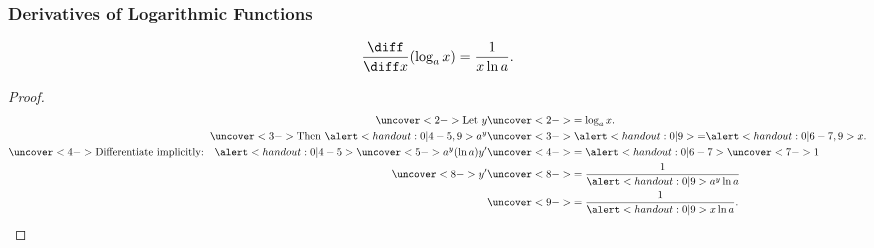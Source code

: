 \begin{frame}
\frametitle{Derivatives of Logarithmic Functions}
\begin{theorem}
\[
\frac{\diff}{\diff x} (\log_a x) = \frac{1}{x\ln a} .
\]
\end{theorem}
\begin{proof}
\abovedisplayskip=0pt
\belowdisplayskip=0pt
\abovedisplayshortskip=0pt
\belowdisplayshortskip=0pt
\begin{align*}
\uncover<2->{%
\text{Let } y %
}%
& \uncover<2->{%
 = \log_a x. %
}\\%
\uncover<3->{%
\text{Then } \alert<handout:0| 4-5,9>{a^y} %
}%
& \uncover<3->{%
 \alert<handout:0| 9>{=} \alert<handout:0| 6-7,9>{x}. %
}\\%
\uncover<4->{%
\text{Differentiate implicitly:}\quad \alert<handout:0| 4-5>{\uncover<5->{a^y (\ln a) y'}} %
}%
& \uncover<4->{%
 = \alert<handout:0| 6-7>{\uncover<7->{1}} %
}\\%
\uncover<8->{%
y' %
}%
& \uncover<8->{%
 = \frac{1}{\alert<handout:0| 9>{a^y}\ln a} %
}\\%
& \uncover<9->{%
 = \frac{1}{\alert<handout:0| 9>{x}\ln a}. %
}%
\end{align*}
\end{proof}
\end{frame}
